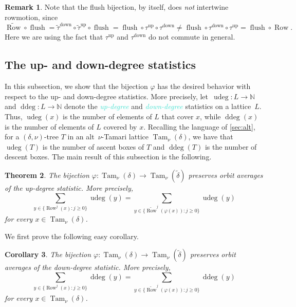 \documentclass[11pt]{amsart}
\newcommand{\altTam}[2]{\operatorname{Tam}_{#1}(#2)}
\newcommand{\up}{^{\operatorname{up}}}
\newcommand{\down}{^{\operatorname{down}}}
\DeclareMathOperator{\row}{Row}
\DeclareMathOperator{\flush}{flush}
\DeclareMathOperator{\ddeg}{ddeg}
\DeclareMathOperator{\udeg}{udeg}
\newcommand{\dfn}[1]{\textcolor{Turquoise}{\emph{#1}}}
\newtheorem{theorem}{Theorem}[section]
\newtheorem{corollary}[theorem]{Corollary}
\theoremstyle{definition}
\newtheorem{remark}[theorem]{Remark}
\begin{document}
\begin{remark}
Note that the flush bijection, by itself, does \emph{not} intertwine rowmotion, since  
\[\widetilde{\row} \circ \flush = \widetilde{\tau}\down \circ \widetilde{\tau}\up \circ \flush = \flush \circ \tau\up \circ \tau\down \neq \flush \circ \tau\down \circ \tau\up = \flush \circ \row.\]
Here we are using the fact that $\tau\up$ and $\tau\down$ do not commute in general.
\end{remark}

\subsection{The up- and down-degree statistics} \label{sec:ddeg}

In this subsection, we show that the bijection $\varphi$ has the desired behavior with respect to the up- and down-degree statistics. More precisely, let~$\udeg\colon L \to \mathbb{N}$ and $\ddeg\colon L \to \mathbb{N}$ denote the \dfn{up-degree} and \dfn{down-degree} statistics on a lattice~$L$. Thus, $\udeg(x)$ is the number of elements of $L$ that cover $x$, while $\ddeg(x)$ is the number of elements of $L$ covered by $x$. Recalling the language of \cref{sec:alt}, for a $(\delta,\nu)$-tree $T$ in an alt~$\nu$-Tamari lattice $\altTam{\nu}{\delta}$, we have that $\udeg(T)$ is the number of ascent boxes of $T$ and $\ddeg(T)$ is the number of descent boxes. The main result of this subsection is the following.

\begin{theorem} \label{thm:varphi_udeg}
The bijection $\varphi\colon \altTam{\nu}{\delta} \to \altTam{\nu}{\widetilde{\delta}}$ preserves orbit averages of the up-degree statistic. More precisely,
\[ \sum_{y \in \{\row^j(x)\colon j\ge 0\}} \udeg(y) = \sum_{y \in \{\widetilde{\row}^j(\varphi(x))\colon j\ge 0\}} \udeg(y) \]
for every $x \in \altTam{\nu}{\delta}$.
\end{theorem}

We first prove the following easy corollary.
\begin{corollary} \label{cor:varphi_ddeg}
The bijection $\varphi\colon \altTam{\nu}{\delta} \to \altTam{\nu}{\widetilde{\delta}}$ preserves orbit averages of the down-degree statistic. More precisely,
\[ \sum_{y \in \{\row^j(x)\colon j\ge 0\}} \ddeg(y) = \sum_{y \in \{\widetilde{\row}^j(\varphi(x))\colon j\ge 0\}} \ddeg(y) \]
for every $x \in \altTam{\nu}{\delta}$.
\end{corollary}
\end{document}

